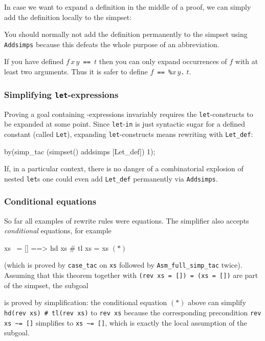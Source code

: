 In case we want to expand a definition in the middle of a proof, we can
simply add the definition locally to the simpset:
\begin{ttbox}
\end{ttbox}
You should normally not add the definition permanently to the simpset
using \texttt{Addsimps} because this defeats the whole purpose of an
abbreviation.

\begin{warn}
If you have defined $f\,x\,y$\texttt{~==~}$t$ then you can only expand
occurrences of $f$ with at least two arguments. Thus it is safer to define
$f$\texttt{~==~\%$x\,y$.}$\;t$.
\end{warn}

\subsubsection{Simplifying \texttt{let}-expressions}

Proving a goal containing -expressions invariably requires the
\texttt{let}-constructs to be expanded at some point. Since
\texttt{let}-\texttt{in} is just syntactic sugar for a defined constant
(called \texttt{Let}), expanding \texttt{let}-constructs means rewriting with
\texttt{Let_def}:
\begin{ttbox}\makeatother
{}
by(simp_tac (simpset() addsimps [Let_def]) 1);
\end{ttbox}
If, in a particular context, there is no danger of a combinatorial explosion
of nested \texttt{let}s one could even add \texttt{Let_def} permanently via
\texttt{Addsimps}.

\subsubsection{Conditional equations}

So far all examples of rewrite rules were equations. The simplifier also
accepts {\em conditional\/} equations, for example
\begin{ttbox}
xs ~= []  ==>  hd xs # tl xs = xs \hfill \((*)\)
\end{ttbox}
(which is proved by \texttt{case_tac} on \texttt{xs} followed by
\texttt{Asm_full_simp_tac} twice). Assuming that this theorem together with
\texttt{(rev xs = []) = (xs = [])}
are part of the simpset, the subgoal
\begin{ttbox}\makeatother
{}
\end{ttbox}
is proved by simplification:
the conditional equation $(*)$ above
can simplify \texttt{hd(rev~xs)~\#~tl(rev~xs)} to \texttt{rev xs}
because the corresponding precondition \verb$rev xs ~= []$ simplifies to
\verb$xs ~= []$, which is exactly the local assumption of the subgoal.


